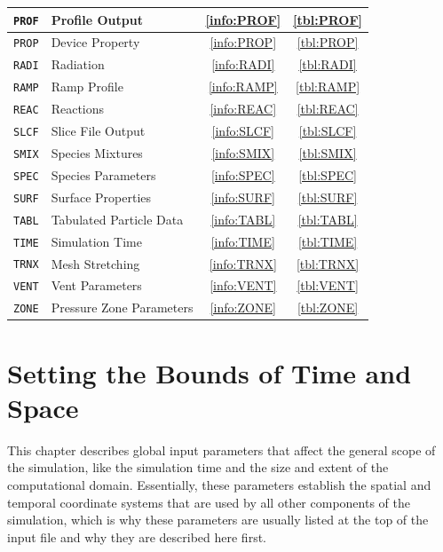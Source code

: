 \documentclass[11pt]{book}
\newcommand{\ct}{\tt\small}
\begin{document}
\begin{table}[ht]
\begin{center}
\begin{tabular}{|c|l|c|c|}
{\ct PROF}  & Profile Output               & \ref{info:PROF} & \ref{tbl:PROF}  \\ \hline
{\ct PROP}  & Device Property              & \ref{info:PROP} & \ref{tbl:PROP}  \\ \hline
{\ct RADI}  & Radiation                    & \ref{info:RADI} & \ref{tbl:RADI}  \\ \hline
{\ct RAMP}  & Ramp Profile                 & \ref{info:RAMP} & \ref{tbl:RAMP}  \\ \hline
{\ct REAC}  & Reactions                    & \ref{info:REAC} & \ref{tbl:REAC}  \\ \hline
{\ct SLCF}  & Slice File Output            & \ref{info:SLCF} & \ref{tbl:SLCF}  \\ \hline
{\ct SMIX}  & Species Mixtures             & \ref{info:SMIX} & \ref{tbl:SMIX}  \\ \hline
{\ct SPEC}  & Species Parameters           & \ref{info:SPEC} & \ref{tbl:SPEC}  \\ \hline
{\ct SURF}  & Surface Properties           & \ref{info:SURF} & \ref{tbl:SURF}  \\ \hline
{\ct TABL}  & Tabulated Particle Data      & \ref{info:TABL} & \ref{tbl:TABL}  \\ \hline
{\ct TIME}  & Simulation Time              & \ref{info:TIME} & \ref{tbl:TIME}  \\ \hline
{\ct TRNX}  & Mesh Stretching              & \ref{info:TRNX} & \ref{tbl:TRNX}  \\ \hline
{\ct VENT}  & Vent Parameters              & \ref{info:VENT} & \ref{tbl:VENT}  \\ \hline
{\ct ZONE}  & Pressure Zone Parameters     & \ref{info:ZONE} & \ref{tbl:ZONE}  \\ \hline
\end{tabular}
\end{center}
\end{table}


\clearpage

\chapter{Setting the Bounds of Time and Space}

This chapter describes global input parameters that affect the general scope of the simulation, like
the simulation time and the size and extent of the computational domain. Essentially, these parameters
establish the spatial and temporal coordinate systems that are used by all other components of the simulation, which is
why these parameters are usually listed at the top of the input file and why they are described here first.
\end{document}
